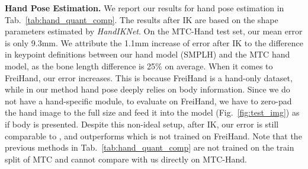 \documentclass[final]{cvpr}
\begin{document}
\begin{table}[t]
  \centering
  \caption{
Body MPJPE on HUMBI.
We demonstrate that incorporating \textit{BodyIKNet} further lowers error.
The small gap between IK- and GT- indicates the high accuracy of body shape estimation.
}
  \label{tab:body_quant_humbi}
\end{table}
\par
\noindent \textbf{Hand Pose Estimation.}
We report our results for hand pose estimation in Tab.~\ref{tab:hand_quant_comp}.
The results after IK are based on the shape parameters estimated by \textit{HandIKNet}.
On the MTC-Hand test set, our mean error is only 9.3mm.
We attribute the 1.1mm increase of error after IK to the difference in keypoint definitions between our hand model (SMPLH) and the MTC hand model, as the bone length difference is 25\% on average.
When it comes to FreiHand, our error increases.
This is because FreiHand is a hand-only dataset, while in our method hand pose deeply relies on body information.
Since we do not have a hand-specific module, to evaluate on FreiHand, we have to zero-pad the hand image to the full size and feed it into the model (Fig.~\ref{fig:test_img}) as if body is presented.
Despite this non-ideal setup, after IK, our error is still comparable to \cite{choutas2020monocular}, and outperforms \cite{zhou2020monocular}
which is not trained on FreiHand.
Note that the previous methods in Tab.~\ref{tab:hand_quant_comp} are not trained on the train split of MTC and cannot compare with us directly on MTC-Hand.
\end{document}
